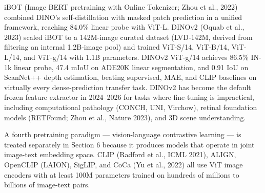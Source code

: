 iBOT (Image BERT pretraining with Online Tokenizer; Zhou et al., 2022) combined DINO's self-distillation with masked patch prediction in a unified framework, reaching 84.0\% linear probe with ViT-L. DINOv2 (Oquab et al., 2023) scaled iBOT to a 142M-image curated dataset (LVD-142M, derived from filtering an internal 1.2B-image pool) and trained ViT-S/14, ViT-B/14, ViT-L/14, and ViT-g/14 with 1.1B parameters. DINOv2 ViT-g/14 achieves 86.5\% IN-1k linear probe, 47.4 mIoU on ADE20K linear segmentation, and 0.91 IoU on ScanNet++ depth estimation, beating supervised, MAE, and CLIP baselines on virtually every dense-prediction transfer task. DINOv2 has become the default frozen feature extractor in 2024--2026 for tasks where fine-tuning is impractical, including computational pathology (CONCH, UNI, Virchow), retinal foundation models (RETFound; Zhou et al., Nature 2023), and 3D scene understanding.

A fourth pretraining paradigm --- vision-language contrastive learning --- is treated separately in Section 6 because it produces models that operate in joint image-text embedding space. CLIP (Radford et al., ICML 2021), ALIGN, OpenCLIP (LAION), SigLIP, and CoCa (Yu et al., 2022) all use ViT image encoders with at least 100M parameters trained on hundreds of millions to billions of image-text pairs.

